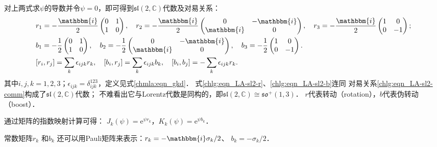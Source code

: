 对上两式求$\psi$的导数并令$\psi=0$，即可得到$\mathfrak{sl}(2,\mathbb{C})$代数及对易关系：
\begin{subequations}\label{chlg:eqn_LA-sl2c}
\begin{align}
    &r_1=-\frac{\mathbbm{i}}{2} \begin{pmatrix}  0 & 1  \\ 1 & 0  \end{pmatrix}, \quad 
     r_2=-\frac{\mathbbm{i}}{2} \begin{pmatrix}  0 & -\mathbbm{i} \\ \mathbbm{i} & 0 \end{pmatrix}, \quad
     r_3=-\frac{\mathbbm{i}}{2} \begin{pmatrix}  1 & 0 \\     0 & -1
      \end{pmatrix}; \label{chlg:eqn_LA-sl2-r} \\
    &b_1=-\frac{1}{2}\begin{pmatrix}    0 & 1 \\ 1 & 0  \end{pmatrix}, \quad
     b_2=-\frac{1}{2}\begin{pmatrix}    0 & -\mathbbm{i}  \\ \mathbbm{i}  & 0  \end{pmatrix},\quad
     b_3=-\frac{1}{2}\begin{pmatrix}    1 & 0 \\   0 & -1 
      \end{pmatrix} . \label{chlg:eqn_LA-sl2-b} \\
    &[r_i, r_j] = \sum_k \epsilon_{ijk} r_k,\quad
    [b_i, r_j] = \sum_k \epsilon_{ijk} b_k,\quad
    [b_i, b_j] = -\sum_k \epsilon_{ijk} r_k. \label{chlg:eqn_LA-sl2-comm}
\end{align}
\end{subequations}
其中$i,j,k=1,2,3$；$\epsilon_{ijk}=\delta^{123}_{ijk}$，定义见式\eqref{chmla:eqn_gkd}．
式\eqref{chlg:eqn_LA-sl2-r}、\eqref{chlg:eqn_LA-sl2-b}连同
对易关系\eqref{chlg:eqn_LA-sl2-comm}构成了$\mathfrak{sl}(2,\mathbb{C})$代数；
不难看出它与Lorentz代数是同构的，即$\mathfrak{sl}(2,\mathbb{C})\cong \mathfrak{so}^{+}(1,3)$．
$r$代表转动（rotation），$b$代表伪转动（boost）．

通过矩阵的指数映射计算可得：
$J_k(\psi)=\mathrm{e}^{\psi r_k}$，$ K_k(\psi)=\mathrm{e}^{\psi b_k}$．

常数矩阵$r_k$ 和$b_k$ 还可以用Pauli矩阵来表示：$r_k= -\mathbbm{i} \sigma_k / 2$、 $b_k=-\sigma_k / 2$．


